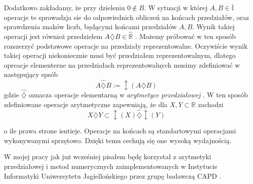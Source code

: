  Dodatkowo zakładamy, że przy dzieleniu $0 \notin B $. W sytuacji w której $ A,B \in \overline{ \mathbb I } $ operacje te sprowadzja 
 sie do odpowiednich obliczeń na końcach przedziałów, oraz sprawdzenia znaków liczb, będącymi końcami przedziałów $ A,B $.
 Wynik takiej operacji jest również przedziełem $ A \diamondsuit B \in \hat {\mathbb R } $ .
 Możemy próbować w ten sposób rozszerzyć podstawowe operacje na przedziały reprezentowalne. Oczywiście wynik takiej operacji
 niekoniecznie musi być przedziałem reprezentowalnym, dlatego opreacje elementerne na przedziałach reprezentowalnych musimy zdefiniować w
 następujący spsób 
 \begin{equation}
    A \hat{\diamondsuit} B := \updownarrow (A \diamondsuit B ) 
 \end{equation}
 gdzie $ \hat { \diamondsuit } $ oznacza operacje elementarną w {\em arytmetyce przedziałowej }. 
 W ten sposób zdefiniowane operacje arytmetyczne zapewniają, że dla $ X,Y \subset \mathbb R $ zachodzi
 \begin{equation}
    X \diamondsuit Y \subset \updownarrow(X) \hat{\diamondsuit} \updownarrow(Y)
 \end{equation}
 
 o ile prawa strone isntieje. 
 Operacje na końcach są standartowymi operacjami wykonywanymi sprzętowo. Dzięki temu cechują się one 
 wysoką wydajnością. 
 
 W mojej pracy jak już wcześniej pisałem będę korzystał z arytmetyki przedziałowej i metod numerycznych zaimplementowanych w Instytucie Informatyki Uniwersytetu 
 Jagiellońskiego przez grupę badawczą CAPD \cite{CAPD}.

 


